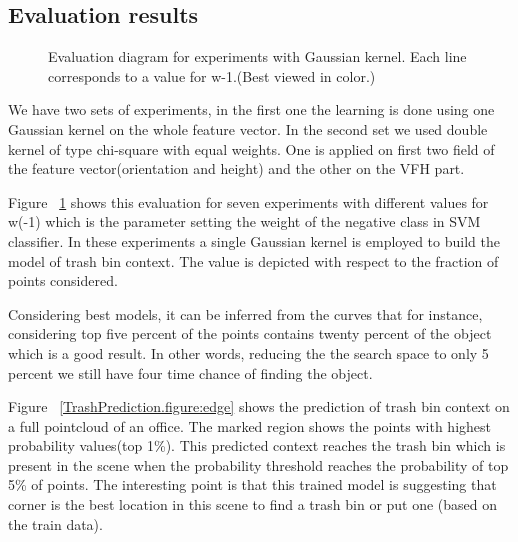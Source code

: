 \subsection{Evaluation results}
\label{EvaluationResult.ssec}

\begin{figure}[t]
  \caption[Evaluation diagram for experiments with Gaussian kernel.]
  {Evaluation diagram for experiments with Gaussian kernel. Each line corresponds to a value for w-1.(Best viewed in color.)}
  \label{evalSevenExp.figure}
\end{figure}
We have two sets of experiments, in the first one the learning is done using one Gaussian kernel on the whole feature vector.
In the second set we used double kernel of type chi-square with equal weights.
One is applied on first two field of the feature vector(orientation and height) and the other on the VFH part.

Figure ~\ref{evalSevenExp.figure} shows this evaluation for seven experiments with different values for w(-1) which is the 
parameter setting the weight of the negative class in SVM classifier.
In these experiments a single Gaussian kernel is employed to build the model of trash bin context.
The value is depicted with respect to the fraction of points considered.

Considering best models, it can be inferred from the curves that for instance, considering top five percent of the points 
contains twenty percent of the object which is a good result. 
In other words, reducing the the search space to only 5 percent we still have four time chance of finding the object.



Figure ~\ref{TrashPrediction.figure:edge} shows the prediction of trash bin context on a full pointcloud of an office. 
The marked region shows the points with highest probability values(top 1\%).
This predicted context reaches the trash bin which is present in the scene when the probability threshold reaches the 
probability of top 5\% of points.
The interesting point is that this trained model is suggesting that corner is the best location in this scene to find a 
trash bin or put one (based on the train data).

